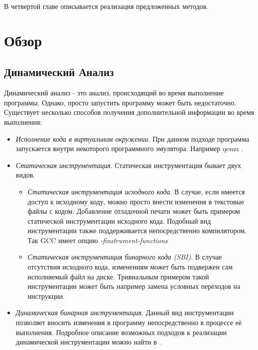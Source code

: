В четвертой главе описывается реализация предложенных методов.



\chapter{Обзор}


\section{Динамический Анализ}

Динамический анализ - это анализ, происходящий во время выполнение программы. Однако, просто запустить программу может быть недостаточно. Существует несколько способов получения дополнительной информации во время выполнения:

\begin{itemize}
\item {\em Исполнение кода в виртуальном окружении}. При данном подходе программа запускается внутри некоторого программного эмулятора. Например qemu \cite{QEMU}.

\item {\em Статическая инструментация}.
Статическая инструментация бывает двух видов.
    \begin{itemize}
        \item {\em Статическая инструментация исходного кода}. В случае, если имеется доступ к исходному коду, можно просто внести изменения в текстовые файлы с кодом. Добавление отладочной печати может быть примером статической инструментации исходного кода. Подобный вид инструментации также поддерживается непосредственно компилятором. Так GCC имеет опцию  \textit{-finstrument-functions}
        \item {\em Статическая инструментация бинарного кода (SBI)}. В случае отсутствия исходного кода, изменениям может быть подвержен сам исполняемый файл на диске. Тривиальным примером такой инструментации может быть например замена условных переходов на  инструкции. 
    \end{itemize}

\item {\em Динамическая бинарная инструментация}. Данный вид инструментации позволяет вносить изменения в программу непосредственно в процессе её выполнения. Подробное описание возможных подходов к реализации динамической инструментации можно найти в \cite{PBA}.
\end{itemize}

